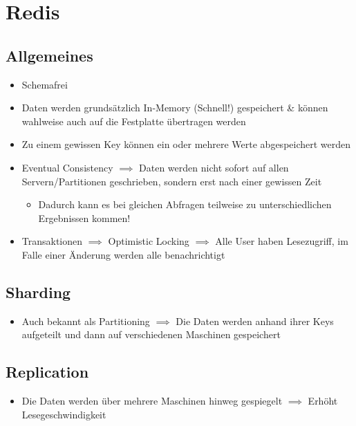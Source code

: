 \section{Redis}
\subsection{Allgemeines}
\begin{itemize}
    \item Schemafrei
    \item Daten werden grundsätzlich In-Memory (Schnell!) gespeichert \& können wahlweise auch auf die Festplatte übertragen werden
    \item Zu einem gewissen Key können ein oder mehrere Werte abgespeichert werden
    \item Eventual Consistency $\implies$ Daten werden nicht sofort auf allen Servern/Partitionen geschrieben, sondern erst nach einer gewissen Zeit
    \begin{itemize}
        \item Dadurch kann es bei gleichen Abfragen teilweise zu unterschiedlichen Ergebnissen kommen!
    \end{itemize}
    \item Transaktionen $\implies$ Optimistic Locking $\implies$ Alle User haben Lesezugriff, im Falle einer Änderung werden alle benachrichtigt
\end{itemize}

\subsection{Sharding}
\begin{itemize}
    \item Auch bekannt als Partitioning $\implies$ Die Daten werden anhand ihrer Keys aufgeteilt und dann auf verschiedenen Maschinen gespeichert
\end{itemize}

\subsection{Replication}
\begin{itemize}
    \item Die Daten werden über mehrere Maschinen hinweg gespiegelt $\implies$ Erhöht Lesegeschwindigkeit
\end{itemize}

